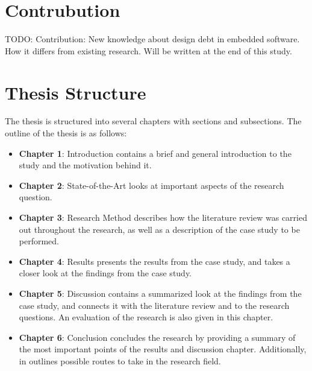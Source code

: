 \section{Contrubution}
TODO: Contribution: New knowledge about design debt in embedded software. How it differs from existing research. Will be written at the end of this study.


\section{Thesis Structure}
The thesis is structured into several chapters with sections and subsections. The outline of the thesis is as follows:
\begin{itemize}
	\item{\textbf{Chapter 1}}: Introduction contains a brief and general introduction to the study and the motivation behind it.
	\item{\textbf{Chapter 2}}: State-of-the-Art looks at important aspects of the research question.
	\item{\textbf{Chapter 3}}: Research Method describes how the literature review was carried out throughout the research, as well as a description of the case study to be performed.
	\item{\textbf{Chapter 4}}: Results presents the results from the case study, and takes a closer look at the findings from the case study.
	\item{\textbf{Chapter 5}}: Discussion contains a summarized look at the findings from the case study, and connects it with the literature review and to the research questions. An evaluation of the research is also given in this chapter.
	\item{\textbf{Chapter 6}}: Conclusion concludes the research by providing a summary of the most important points of the results and discussion chapter. Additionally, in outlines possible routes to take in the research field.
\end{itemize}

